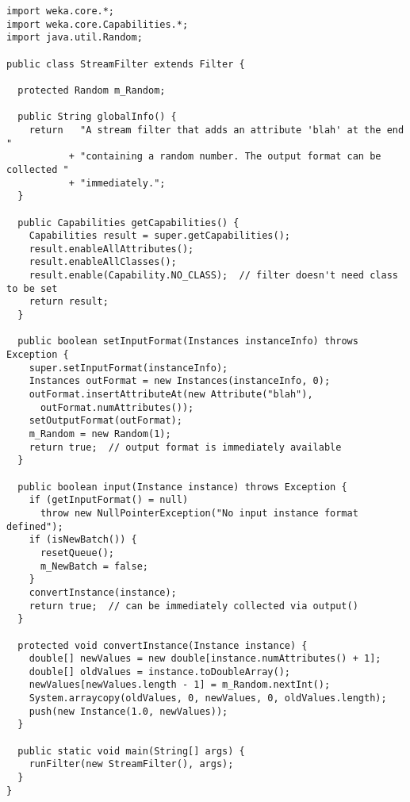 
\begin{verbatim}
import weka.core.*;
import weka.core.Capabilities.*;
import java.util.Random;

public class StreamFilter extends Filter {

  protected Random m_Random;

  public String globalInfo() {
    return   "A stream filter that adds an attribute 'blah' at the end "
           + "containing a random number. The output format can be collected "
           + "immediately.";
  }

  public Capabilities getCapabilities() {
    Capabilities result = super.getCapabilities();
    result.enableAllAttributes();
    result.enableAllClasses();
    result.enable(Capability.NO_CLASS);  // filter doesn't need class to be set
    return result;
  }

  public boolean setInputFormat(Instances instanceInfo) throws Exception {
    super.setInputFormat(instanceInfo);
    Instances outFormat = new Instances(instanceInfo, 0);
    outFormat.insertAttributeAt(new Attribute("blah"),
	  outFormat.numAttributes());
    setOutputFormat(outFormat);
    m_Random = new Random(1);
    return true;  // output format is immediately available
  }

  public boolean input(Instance instance) throws Exception {
    if (getInputFormat() = null)
      throw new NullPointerException("No input instance format defined");
    if (isNewBatch()) {
      resetQueue();
      m_NewBatch = false;
    }
    convertInstance(instance);
    return true;  // can be immediately collected via output()
  }

  protected void convertInstance(Instance instance) {
    double[] newValues = new double[instance.numAttributes() + 1];
    double[] oldValues = instance.toDoubleArray();
    newValues[newValues.length - 1] = m_Random.nextInt();
    System.arraycopy(oldValues, 0, newValues, 0, oldValues.length);
    push(new Instance(1.0, newValues));
  }

  public static void main(String[] args) {
    runFilter(new StreamFilter(), args);
  }
}
\end{verbatim}
